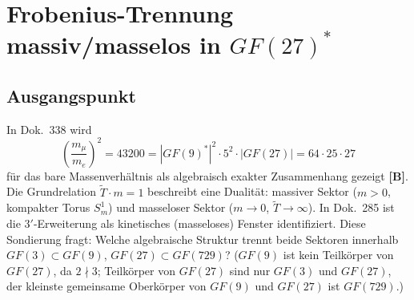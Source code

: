 
\providecommand{\BM}{\textbf{[B]}}
\providecommand{\KM}{\textbf{[K]}}
\providecommand{\SM}{\textbf{[S]}}
\providecommand{\LM}{\textbf{[L]}}
\providecommand{\SetzM}{\textbf{[SETZUNG]}}

\chapter*{Frobenius-Trennung massiv/masselos in $GF(27)^*$}

\begin{abstract}
Die multiplikative Gruppe $GF(27)^* \cong \mathbb{Z}_{26}$ zerfällt unter dem
Frobenius-Automorphismus $\phi: x \mapsto x^3$ in genau zwei Typen: zwei
Fixpunkte $\{+1,-1\}$ und acht Dreier-Orbits. Vermöge der Zerlegung
$\mathbb{Z}_{26} \cong \mathbb{Z}_2 \times \mathbb{Z}_{13}$ (chinesischer Restsatz)
entsprechen vier $\mathbb{Z}_{13}$-Dreier-Orbits mal zwei $\mathbb{Z}_2$-Paritäten
den acht Gluonen der adjungierten $SU(3)$-Darstellung. Die Orbit-Zerlegung
selbst ist algebraisch erzwungen. Für die Fixpunkte $\{+1,-1\}$ gibt es zwei
Lesarten: als massiver $\mathbb{Z}_2$-Sektor (Teilchen/Antiteilchen) und, als
$GF(3)^*$ des Fixkörpers $GF(3)$, als $U(1)$-Sektor (Photon). Da es dieselbe
Menge ist, ist diese Doppelzuordnung nicht aufgelöst; die Zuordnung ist offen
\SM. Ob die masselosen Moden Spin~1 tragen, folgt nicht aus der
Frobenius-Struktur (Dok.~231, offen). Status: \KM.
\end{abstract}

\section{Ausgangspunkt}

In Dok.~338 wird
\[
\left(\frac{m_\mu}{m_e}\right)^2 = 43200
= |GF(9)^*|^2 \cdot 5^2 \cdot |GF(27)|
= 64 \cdot 25 \cdot 27
\]
für das bare Massenverhältnis als algebraisch exakter Zusammenhang gezeigt \BM. Die Grundrelation
$\tilde{T}\cdot m=1$ beschreibt eine Dualität: massiver Sektor ($m>0$,
kompakter Torus $S^1_m$) und masseloser Sektor ($m\to0$, $\tilde{T}\to\infty$).
In Dok.~285 ist die $3'$-Erweiterung als kinetisches (masseloses) Fenster
identifiziert. Diese Sondierung fragt: Welche algebraische Struktur trennt beide
Sektoren innerhalb $GF(3)\subset GF(9)$, $GF(27)\subset GF(729)$?
($GF(9)$ ist kein Teilkörper von $GF(27)$, da $2\nmid3$; Teilkörper von $GF(27)$
sind nur $GF(3)$ und $GF(27)$, der kleinste gemeinsame Oberkörper von $GF(9)$
und $GF(27)$ ist $GF(729)$.)

